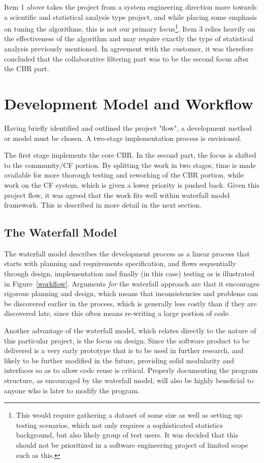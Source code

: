 Item 1 above takes the project from a system engineering direction more towards a scientific and statistical analysis type project, and while placing some emphasis on tuning the algorithms, this is not our primary focus\footnote{This would require gathering a dataset of some size as well as setting up testing scenarios, which not only requires a sophisticated statistics background, but also likely group of test users. It was decided that this should not be prioritized in a software engineering project of limited scope such as this.}. Item 3 relies heavily on the effectiveness of the algorithm and may require exactly the type of statistical analysis previously mentioned. In agreement with the customer, it was therefore concluded that the collaborative filtering part was to be the second focus after the CBR part. 

\section{Development Model and Workflow}
Having briefly identified and outlined the project "flow", a development method or model must be chosen. A two-stage implementation process is envisioned.

The first stage implements the core CBR.  In the second part, the focus is shifted to the community/CF portion. By splitting the work in two stages, time is made available for more thorough testing and reworking of the CBR portion, while work on the CF system, which is given a lower priority is pushed back. Given this project flow, it was agreed that the work fits well within waterfall model framework. This is described in more detail in the next section. 


\subsection{The Waterfall Model}
The waterfall model describes the development process as a linear process that starts with planning and requirements specification, and flows sequentially through design, implementation and finally (in this case) testing as is illustrated in Figure~\ref{workflow}. Arguments \emph{for} the waterfall approach are that it encourages rigorous planning and design, which means that inconsistencies and problems can be discovered earlier in the process, which is generally less costly than if they are discovered late, since this often means re-writing a large portion of code. 

Another advantage of the waterfall model, which relates directly to the nature of this particular project, is the focus on design. Since the software product to be delivered is a very early prototype that is to be used in further research, and likely to be further modified in the future, providing solid modularity and interfaces so as to allow code reuse is critical. Properly documenting the program structure, as encouraged by the waterfall model, will also be highly beneficial to anyone who is later to modify the program.

